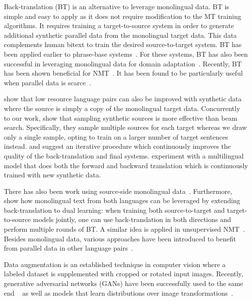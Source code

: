 \documentclass[11pt,a4paper]{article}
\begin{document}
Back-translation (BT) is an alternative to leverage monolingual data. BT is simple and easy to apply as it does not require modification to the MT training algorithms. It requires training a target-to-source system in order to generate additional synthetic parallel data from the monolingual target data. 
This data complements human bitext to train the desired source-to-target system. BT has been applied earlier to phrase-base systems~\citep{bojar:bt_pbmt:2011}. For these systems, BT has also been successful in leveraging monolingual data for domain adaptation~\cite{bertoldi:adaptation:2009,lambert:adaptation:2011}. Recently, BT has
been shown beneficial for NMT~\citep{sennrich:backtranslation:2016,poncelas:investigatingBT:2018}. It has been found to be particularly useful when parallel data is scarce~\citep{karakanta:lowresource:2017}.

\citet{currey:copybt:2017} show that low resource language pairs can also be improved with synthetic data where the source is simply a copy of the monolingual target data.
Concurrently to our work, \citet{imamura:enhancement:2018} show that sampling synthetic sources is more effective than beam search. 
Specifically, they sample multiple sources for each target whereas we draw only a single sample, opting to train on a larger number of target sentences instead.
\citet{hoang:iterative:2018} and \citet{cotterell:explaining:2018} suggest an iterative procedure which continuously improves the quality of the back-translation and final systems.
\citet{niu:bi:2018} experiment with a multilingual model that does both the forward and backward translation which is continuously trained with new synthetic data.

There has also been work using source-side monolingual data~\cite{zhang:sourcemono:2016}. 
Furthermore, \citet{cheng:semi:2016,he:dual:2016,xia:dual:2017} show how monolingual text from both languages can be leveraged by extending back-translation to dual learning: when training both source-to-target and target-to-source models jointly, one can use back-translation in both directions and perform multiple rounds of BT. A similar idea is applied in unsupervised NMT~\citep{lample:unsupervised:2018,lample:unsupervised2:2018}.
Besides monolingual data, various approaches have been introduced to benefit from parallel data in other language pairs~\citep{johnson:multi:2017,firat:multi:2016,firat:zero:2016,ha:multi:2016,gu:universal:2018}.

Data augmentation is an established technique in computer vision where a labeled dataset is supplemented with cropped or rotated input images. 
Recently, generative adversarial networks (GANs) have been successfully used to the same end ~\citep{antoniou:augmentation:2017,perez:augmentation:2017} as well as models that learn distributions over image transformations~\citep{hauberg:dreaming:2016}.
\end{document}
